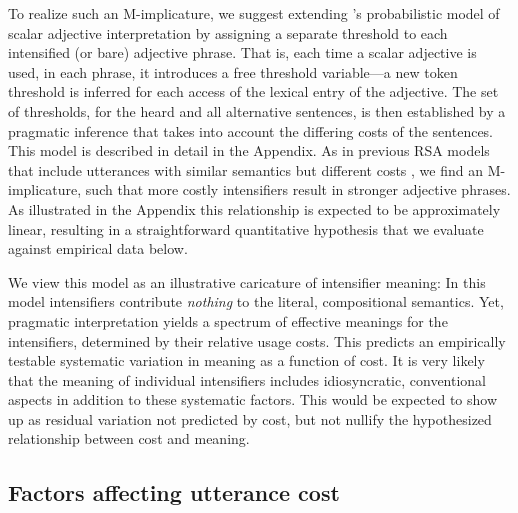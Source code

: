 \documentclass[10pt,letterpaper]{article}
\begin{document}
To realize such an M-implicature, we suggest extending 's probabilistic model of scalar adjective interpretation by assigning a separate threshold to each intensified (or bare) adjective phrase. That is, each time a scalar adjective is used, in each phrase, it introduces a free threshold variable---a new token threshold is inferred for each access of the lexical entry of the adjective.
The set of thresholds, for the heard and all alternative sentences, is then established by a pragmatic inference that takes into account the differing costs of the sentences.
This model is described in detail in the Appendix.
As in previous RSA models that include utterances with similar semantics but different costs \cite{bergen}, we find an M-implicature, such that more costly intensifiers result in stronger adjective phrases.
As illustrated in the Appendix this relationship is expected to be approximately linear, resulting in a straightforward quantitative hypothesis that we evaluate against empirical data below.

We view this model as an illustrative caricature of intensifier meaning: In this model intensifiers contribute \emph{nothing} to the literal, compositional semantics. Yet, pragmatic interpretation yields a spectrum of effective meanings for the intensifiers, determined by their relative usage costs. This predicts an empirically testable systematic variation in meaning as a function of cost.
It is very likely that the meaning of individual intensifiers includes idiosyncratic, conventional aspects in addition to these systematic factors. This would be expected to show up as residual variation not predicted by cost, but not nullify the hypothesized relationship between cost and meaning.


% 


\subsection{Factors affecting utterance cost}
\end{document}
